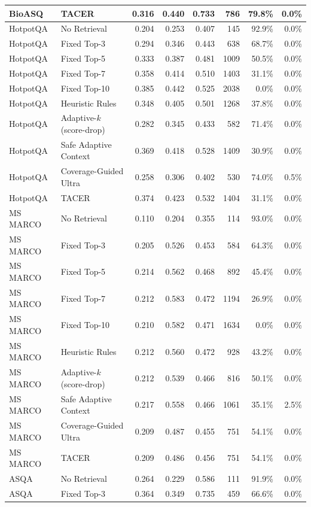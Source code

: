 \documentclass[11pt]{article}
\begin{document}
\begin{table}[!htbp]
{\begin{tabular}{llrrrrrr}
BioASQ & TACER & 0.316 & 0.440 & 0.733 & 786 & 79.8\% & 0.0\% \\
\midrule
HotpotQA & No Retrieval & 0.204 & 0.253 & 0.407 & 145 & 92.9\% & 0.0\% \\
HotpotQA & Fixed Top-3 & 0.294 & 0.346 & 0.443 & 638 & 68.7\% & 0.0\% \\
HotpotQA & Fixed Top-5 & 0.333 & 0.387 & 0.481 & 1009 & 50.5\% & 0.0\% \\
HotpotQA & Fixed Top-7 & 0.358 & 0.414 & 0.510 & 1403 & 31.1\% & 0.0\% \\
HotpotQA & Fixed Top-10 & 0.385 & 0.442 & 0.525 & 2038 & 0.0\% & 0.0\% \\
HotpotQA & Heuristic Rules & 0.348 & 0.405 & 0.501 & 1268 & 37.8\% & 0.0\% \\
HotpotQA & Adaptive-$k$ (score-drop) & 0.282 & 0.345 & 0.433 & 582 & 71.4\% & 0.0\% \\
HotpotQA & Safe Adaptive Context & 0.369 & 0.418 & 0.528 & 1409 & 30.9\% & 0.0\% \\
HotpotQA & Coverage-Guided Ultra & 0.258 & 0.306 & 0.402 & 530 & 74.0\% & 0.5\% \\
HotpotQA & TACER & 0.374 & 0.423 & 0.532 & 1404 & 31.1\% & 0.0\% \\
\midrule
MS MARCO & No Retrieval & 0.110 & 0.204 & 0.355 & 114 & 93.0\% & 0.0\% \\
MS MARCO & Fixed Top-3 & 0.205 & 0.526 & 0.453 & 584 & 64.3\% & 0.0\% \\
MS MARCO & Fixed Top-5 & 0.214 & 0.562 & 0.468 & 892 & 45.4\% & 0.0\% \\
MS MARCO & Fixed Top-7 & 0.212 & 0.583 & 0.472 & 1194 & 26.9\% & 0.0\% \\
MS MARCO & Fixed Top-10 & 0.210 & 0.582 & 0.471 & 1634 & 0.0\% & 0.0\% \\
MS MARCO & Heuristic Rules & 0.212 & 0.560 & 0.472 & 928 & 43.2\% & 0.0\% \\
MS MARCO & Adaptive-$k$ (score-drop) & 0.212 & 0.539 & 0.466 & 816 & 50.1\% & 0.0\% \\
MS MARCO & Safe Adaptive Context & 0.217 & 0.558 & 0.466 & 1061 & 35.1\% & 2.5\% \\
MS MARCO & Coverage-Guided Ultra & 0.209 & 0.487 & 0.455 & 751 & 54.1\% & 0.0\% \\
MS MARCO & TACER & 0.209 & 0.486 & 0.456 & 751 & 54.1\% & 0.0\% \\
\midrule
ASQA & No Retrieval & 0.264 & 0.229 & 0.586 & 111 & 91.9\% & 0.0\% \\
ASQA & Fixed Top-3 & 0.364 & 0.349 & 0.735 & 459 & 66.6\% & 0.0\% \\

\end{tabular}}
\end{table}
\end{document}
